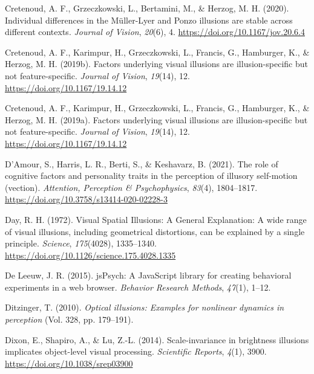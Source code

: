 \documentclass[
  man,floatsintext]{apa6}
\newlength{\cslhangindent}
\newlength{\cslentryspacingunit} %
\newenvironment{CSLReferences}[2] %
 {%
  \setlength{\parindent}{0pt}
  \ifodd #1
  \let\oldpar\par
  \def\par{\hangindent=\cslhangindent\oldpar}
  \fi
  \setlength{\parskip}{#2\cslentryspacingunit}
 }%
 {}
\begin{document}
\begin{CSLReferences}{1}{0}
\leavevmode{}%
Cretenoud, A. F., Grzeczkowski, L., Bertamini, M., \& Herzog, M. H. (2020). Individual differences in the Müller-Lyer and Ponzo illusions are stable across different contexts. \emph{Journal of Vision}, \emph{20}(6), 4. \url{https://doi.org/10.1167/jov.20.6.4}

\leavevmode{}%
Cretenoud, A. F., Karimpur, H., Grzeczkowski, L., Francis, G., Hamburger, K., \& Herzog, M. H. (2019b). Factors underlying visual illusions are illusion-specific but not feature-specific. \emph{Journal of Vision}, \emph{19}(14), 12. \url{https://doi.org/10.1167/19.14.12}

\leavevmode{}%
Cretenoud, A. F., Karimpur, H., Grzeczkowski, L., Francis, G., Hamburger, K., \& Herzog, M. H. (2019a). Factors underlying visual illusions are illusion-specific but not feature-specific. \emph{Journal of Vision}, \emph{19}(14), 12. \url{https://doi.org/10.1167/19.14.12}

\leavevmode{}%
D'Amour, S., Harris, L. R., Berti, S., \& Keshavarz, B. (2021). The role of cognitive factors and personality traits in the perception of illusory self-motion (vection). \emph{Attention, Perception \& Psychophysics}, \emph{83}(4), 1804--1817. \url{https://doi.org/10.3758/s13414-020-02228-3}

\leavevmode{}%
Day, R. H. (1972). Visual Spatial Illusions: A General Explanation: A wide range of visual illusions, including geometrical distortions, can be explained by a single principle. \emph{Science}, \emph{175}(4028), 1335--1340. \url{https://doi.org/10.1126/science.175.4028.1335}

\leavevmode{}%
De Leeuw, J. R. (2015). jsPsych: A JavaScript library for creating behavioral experiments in a web browser. \emph{Behavior Research Methods}, \emph{47}(1), 1--12.

\leavevmode{}%
Ditzinger, T. (2010). \emph{Optical illusions: Examples for nonlinear dynamics in perception} (Vol. 328, pp. 179--191).

\leavevmode{}%
Dixon, E., Shapiro, A., \& Lu, Z.-L. (2014). Scale-invariance in brightness illusions implicates object-level visual processing. \emph{Scientific Reports}, \emph{4}(1), 3900. \url{https://doi.org/10.1038/srep03900}


\end{CSLReferences}
\end{document}
